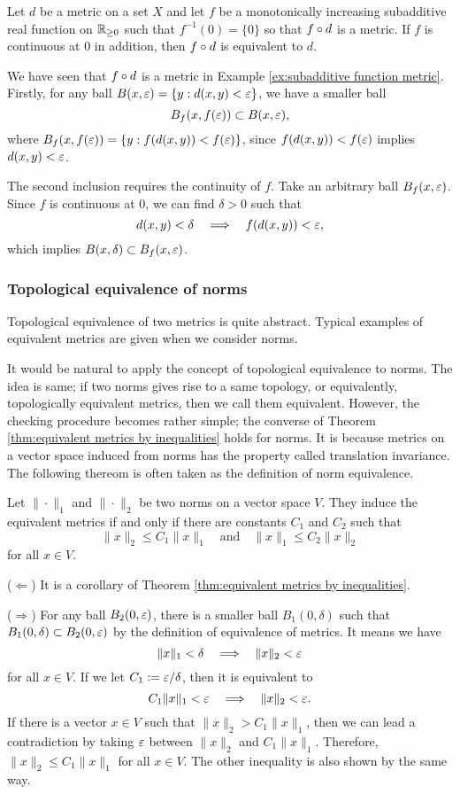 \documentclass{../crs}
\begin{document}
\begin{thm}\label{thm:equivalent metrics by subadditive function}
Let $d$ be a metric on a set $X$ and let $f$ be a monotonically increasing subadditive real function on $\mathbb{R}_{\ge0}$ such that $f^{-1}(0)=\{0\}$ so that $f\circ d$ is a metric.
If $f$ is continuous at 0 in addition, then $f\circ d$ is equivalent to $d$.
\end{thm}
\begin{pf}
We have seen that $f\circ d$ is a metric in Example \ref{ex:subadditive function metric}.
Firstly, for any ball $B(x,\varepsilon)=\{y:d(x,y)<\varepsilon\}$, we have a smaller ball
\[B_f(x,f(\varepsilon))\subset B(x,\varepsilon),\]
where $B_f(x,f(\varepsilon))=\{y:f(d(x,y))<f(\varepsilon)\}$, since $f(d(x,y))<f(\varepsilon)$ implies $d(x,y)<\varepsilon$.

The second inclusion requires the continuity of $f$.
Take an arbitrary ball $B_f(x,\varepsilon)$.
Since $f$ is continuous at 0, we can find $\delta>0$ such that
\[d(x,y)<\delta\impl f(d(x,y))<\e,\]
which implies $B(x,\delta)\subset B_f(x,\varepsilon)$.
\end{pf}

\subsubsection{Topological equivalence of norms}

Topological equivalence of two metrics is quite abstract.
Typical examples of equivalent metrics are given when we consider norms.

It would be natural to apply the concept of topological equivalence to norms.
The idea is same; if two norms gives rise to a same topology, or equivalently, topologically equivalent metrics, then we call them equivalent.
However, the checking procedure becomes rather simple; the converse of Theorem \ref{thm:equivalent metrics by inequalities} holds for norms.
It is because metrics on a vector space induced from norms has the property called translation invariance.
The following thereom is often taken as the definition of norm equivalence.

\begin{thm}
Let $\|\cdot\|_1$ and $\|\cdot\|_2$ be two norms on a vector space $V$.
They induce the equivalent metrics if and only if there are constants $C_1$ and $C_2$ such that
\[\|x\|_2\le C_1\|x\|_1\quad\text{and}\quad\|x\|_1\le C_2\|x\|_2\]
for all $x\in V$.
\end{thm}
\begin{pf}
($\Leftarrow$) It is a corollary of Theorem \ref{thm:equivalent metrics by inequalities}.

($\Rightarrow$)
For any ball $B_2(0,\varepsilon)$, there is a smaller ball $B_1(0,\delta)$ such that $B_1(0,\delta)\subset B_2(0,\varepsilon)$ by the definition of equivalence of metrics.
It means we have
\[\|x\|_1<\delta\impl\|x\|_2<\e\]
for all $x\in V$.
If we let $C_1:=\varepsilon/\delta$, then it is equivalent to
\[C_1\|x\|_1<\e\impl\|x\|_2<\e.\]
If there is a vector $x\in V$ such that $\|x\|_2>C_1\|x\|_1$, then we can lead a contradiction by taking $\varepsilon$ between $\|x\|_2$ and $C_1\|x\|_1$.
Therefore, $\|x\|_2\le C_1\|x\|_1$ for all $x\in V$.
The other inequality is also shown by the same way.
\end{pf}
\end{document}
